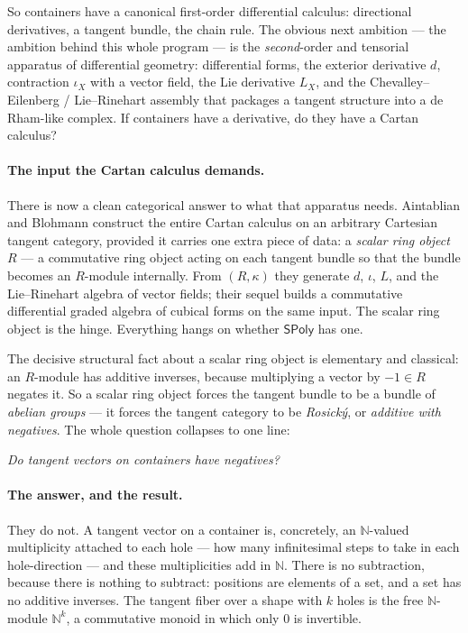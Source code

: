 \documentclass[11pt]{article}
\theoremstyle{definition}
\newcommand{\SPoly}{\mathsf{SPoly}}
\newcommand{\N}{\mathbb{N}}
\begin{document}
So containers have a canonical first-order differential calculus: directional derivatives,
a tangent bundle, the chain rule. The obvious next ambition --- the ambition behind this
whole program --- is the \emph{second}-order and tensorial apparatus of differential
geometry: differential forms, the exterior derivative $d$, contraction $\iota_X$ with a
vector field, the Lie derivative $L_X$, and the Chevalley--Eilenberg / Lie--Rinehart
assembly that packages a tangent structure into a de Rham-like complex. If containers have
a derivative, do they have a Cartan calculus?

\paragraph{The input the Cartan calculus demands.}
There is now a clean categorical answer to what that apparatus needs. Aintablian and
Blohmann \cite{AintablianBlohmann2026} construct the entire Cartan calculus on an arbitrary
Cartesian tangent category, provided it carries one extra piece of data: a \emph{scalar
ring object} $R$ --- a commutative ring object acting on each tangent bundle so that the
bundle becomes an $R$-module internally. From $(R,\kappa)$ they generate $d$, $\iota$, $L$,
and the Lie--Rinehart algebra of vector fields; their sequel \cite{AintablianBlohmann2026b}
builds a commutative differential graded algebra of cubical forms on the same input. The
scalar ring object is the hinge. Everything hangs on whether $\SPoly$ has one.

The decisive structural fact about a scalar ring object is elementary and classical: an
$R$-module has additive inverses, because multiplying a vector by $-1\in R$ negates it. So
a scalar ring object forces the tangent bundle to be a bundle of \emph{abelian groups} ---
it forces the tangent category to be \emph{Rosick\'y}, or \emph{additive with negatives}.
The whole question collapses to one line:

\begin{center}
\emph{Do tangent vectors on containers have negatives?}
\end{center}

\paragraph{The answer, and the result.}
They do not. A tangent vector on a container is, concretely, an $\N$-valued multiplicity
attached to each hole --- how many infinitesimal steps to take in each hole-direction ---
and these multiplicities add in $\N$. There is no subtraction, because there is nothing to
subtract: positions are elements of a set, and a set has no additive inverses. The tangent
fiber over a shape with $k$ holes is the free $\N$-module $\N^k$, a commutative monoid in
which only $0$ is invertible.
\end{document}
